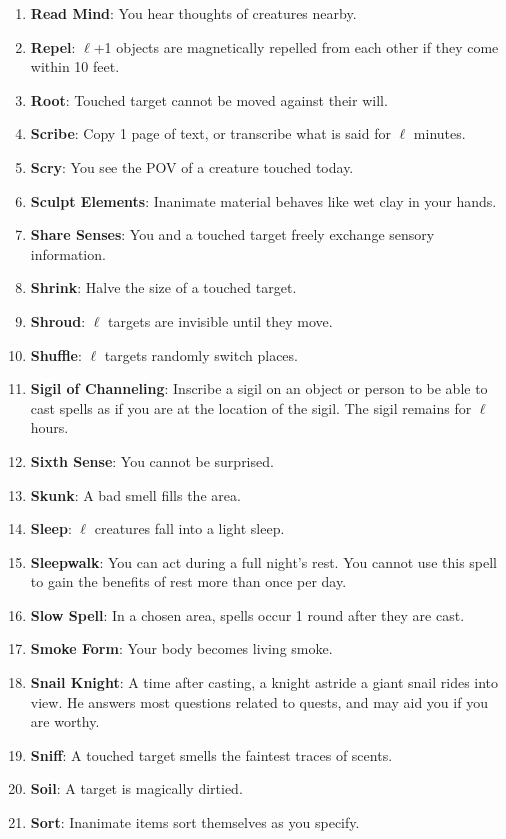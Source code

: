 \documentclass[twoside]{article}
\begin{document}
\begin{enumerate}[nosep]
\item \textbf{Read Mind}: You hear thoughts of creatures nearby.
\item \textbf{Repel}: $\ell$+1 objects are magnetically repelled from each other if they come within 10 feet.
\item \textbf{Root}: Touched target cannot be moved against their will.
\item \textbf{Scribe}: Copy 1 page of text, or transcribe what is said for $\ell$ minutes.
\item \textbf{Scry}: You see the POV of a creature touched today.
\item \textbf{Sculpt Elements}: Inanimate material behaves like wet clay in your hands.
\item \textbf{Share Senses}: You and a touched target freely exchange sensory information.
\item \textbf{Shrink}: Halve the size of a touched target.
\item \textbf{Shroud}: $\ell$ targets are invisible until they move.
\item \textbf{Shuffle}: $\ell$ targets randomly switch places.
\item \textbf{Sigil of Channeling}: Inscribe a sigil on an object or person to be able to cast spells as if you are at the location of the sigil. The sigil remains for $\ell$ hours.
\item \textbf{Sixth Sense}: You cannot be surprised.
\item \textbf{Skunk}: A bad smell fills the area.
\item \textbf{Sleep}: $\ell$ creatures fall into a light sleep.
\item \textbf{Sleepwalk}: You can act during a full night's rest. You cannot use this spell to gain the benefits of rest more than once per day.
\item \textbf{Slow Spell}: In a chosen area, spells occur 1 round after they are cast.
\item \textbf{Smoke Form}: Your body becomes living smoke.
\item \textbf{Snail Knight}: A time after casting, a knight astride a giant snail rides into view. He answers most questions related to quests, and may aid you if you are worthy.
\item \textbf{Sniff}: A touched target smells the faintest traces of scents.
\item \textbf{Soil}: A target is magically dirtied.
\item \textbf{Sort}: Inanimate items sort themselves as you specify.

\end{enumerate}
\end{document}
